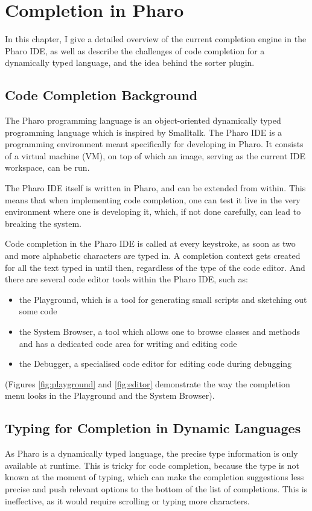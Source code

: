 \chapter{Completion in Pharo}
\label{chap:PharoCompletion}

In this chapter, I give a detailed overview of the current completion engine in the Pharo IDE, as well as describe the challenges of code completion for a dynamically typed language, and the idea behind the sorter plugin.

\section{Code Completion Background}
\label{sec:PharoCompletion-Background}
The Pharo programming language is an object-oriented dynamically typed programming language which is inspired by Smalltalk. The Pharo IDE is a programming environment meant specifically for developing in Pharo. It consists of a virtual machine (VM), on top of which an image, serving as the current IDE workspace, can be run.

The Pharo IDE itself is written in Pharo, and can be extended from within. This means that when implementing code completion, one can test it live in the very environment where one is developing it, which, if not done carefully, can lead to breaking the system.

Code completion in the Pharo IDE is called at every keystroke, as soon as two and more alphabetic characters are typed in. A completion context gets created for all the text typed in until then, regardless of the type of the code editor. And there are several code editor tools within the Pharo IDE, such as:
\begin{itemize}
    \item the Playground, which is a tool for generating small scripts and sketching out some code
    \item the System Browser, a tool which allows one to browse classes and methods and has a dedicated code area for writing and editing code
    \item the Debugger, a specialised code editor for editing code during debugging
\end{itemize}
(Figures \ref{fig:playground} and \ref{fig:editor} demonstrate the way the completion menu looks in the Playground and the System Browser).

\section{Typing for Completion in Dynamic Languages}
\label{sec:PharoCompletion-Typing}
As Pharo is a dynamically typed language, the precise type information is only available at runtime. This is tricky for code completion, because the type is not known at the moment of typing, which can make the completion suggestions less precise and push relevant options to the bottom of the list of completions. This is ineffective, as it would require scrolling or typing more characters.

